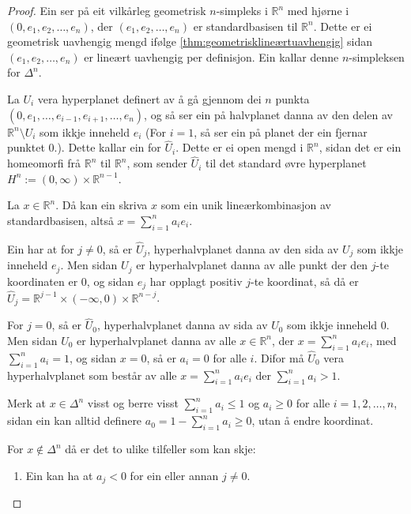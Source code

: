 \documentclass[a4paper, 12pt, norsk]{article}
\theoremstyle{plain}
\theoremstyle{definition}
\newcommand{\Rb}{\mathbb{R}}
\newcommand{\tuple}[1]{ \left( #1 \right) } %
\begin{document}
\begin{proof}
	Ein ser på eit vilkårleg geometrisk \( n \)-simpleks i \( \Rb^n \) med hjørne i \( \tuple{0, e_1, e_2, \dots, e_n} \), der \( \tuple{e_1, e_2, \dots, e_n} \) er standardbasisen til \( \Rb^n \). Dette er ei geometrisk uavhengig mengd ifølge \autoref{thm:geometrisklineærtuavhengig} sidan \( \tuple{e_1, e_2, \dots, e_n} \) er lineært uavhengig per definisjon. Ein kallar denne \( n \)-simpleksen for \( \Delta^n \).

	La \( U_i \) vera hyperplanet definert av å gå gjennom dei \( n \) punkta \( \tuple{0, e_1, \dots, e_{i-1}, e_{i+1}, \dots, e_n} \), og så ser ein på halvplanet danna av den delen av \( \Rb^n \setminus U_i \) som ikkje inneheld \( e_i \) (For \( i=1 \), så ser ein på planet der ein fjernar punktet \( 0 \).). Dette kallar ein for \( \hat{U}_i \). Dette er ei open mengd i \( \Rb^n \), sidan det er ein homeomorfi frå \( \Rb^n \) til \( \Rb^n \), som sender \( \hat{U}_i \) til det standard øvre hyperplanet \( H^n := (0, \infty) \times \Rb^{n-1} \).

	La \( x \in \Rb^n \). Då kan ein skriva \( x \) som ein unik lineærkombinasjon av standardbasisen, altså \( x = \sum_{i=1}^n a_ie_i \). 

	Ein har at for \( j \neq 0 \), så er \( \hat{U}_j \), hyperhalvplanet danna av den sida av \( U_j \) som ikkje inneheld \( e_j \). Men sidan \( U_j \) er hyperhalvplanet danna av alle punkt der den \( j \)-te koordinaten er \( 0 \), og sidan \( e_j \) har opplagt positiv \( j \)-te koordinat, så då er \( \hat{U}_j = \Rb^{j-1}\times(-\infty, 0) \times \Rb^{n-j} \).

	For \( j = 0 \), så er \( \hat{U}_0 \), hyperhalvplanet danna av sida av \( U_0 \) som ikkje inneheld \( 0 \). Men sidan \( U_0 \) er hyperhalvplanet danna av alle \( x \in \Rb^n \),  der \( x = \sum_{i = 1}^n a_i e_i \), med \( \sum_{i = 1}^n a_i = 1 \), og sidan \( x = 0 \), så er \( a_i = 0 \) for alle \( i \). Difor må \( \hat{U}_0 \) vera hyperhalvplanet som består av alle \( x = \sum_{i = 1}^n a_i e_i \) der \( \sum_{i = 1}^n a_i > 1 \).

	Merk at \( x \in \Delta^n \) visst og berre visst \( \sum_{i=1}^n a_i \leq 1 \) og \( a_i \geq 0 \) for alle \( i = 1, 2, \dots, n \), sidan ein kan alltid definere \( a_0 = 1 - \sum_{i=1}^n a_i \geq 0 \), utan å endre koordinat.

	For \( x \not\in \Delta^n \) då er det to ulike tilfeller som kan skje:

	\begin{enumerate}
		\item { Ein kan ha at \( a_j < 0 \) for ein eller annan \( j \neq 0 \).
		
}
\end{enumerate}
\end{proof}
\end{document}
